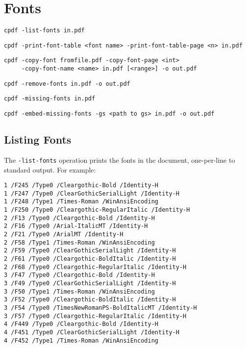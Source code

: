 \documentclass{book}
\begin{document}
\chapter{Fonts}\pagestyle{fancy}\label{chap:14}
 {\small \begin{framed}

  \small\noindent\verb!cpdf -list-fonts in.pdf!

  \vspace{1.5mm}
  \noindent\verb!cpdf -print-font-table <font name> -print-font-table-page <n> in.pdf!
  
  \vspace{1.5mm}
  \noindent\verb!cpdf -copy-font fromfile.pdf -copy-font-page <int>!\\
  \noindent\verb!     -copy-font-name <name> in.pdf [<range>] -o out.pdf!

  \vspace{1.5mm}
  \noindent\verb!cpdf -remove-fonts in.pdf -o out.pdf!

  \vspace{1.5mm}
  \noindent\verb!cpdf -missing-fonts in.pdf!

  \vspace{1.5mm}
  \noindent\verb!cpdf -embed-missing-fonts -gs <path to gs> in.pdf -o out.pdf!
  \end{framed}}

\section{Listing Fonts}

\label{listingfonts}
  The \texttt{-list-fonts} operation prints the fonts in the document,
one-per-line to standard output. For example:
\begin{framed}\small\begin{verbatim}1 /F245 /Type0 /Cleargothic-Bold /Identity-H
1 /F247 /Type0 /ClearGothicSerialLight /Identity-H
1 /F248 /Type1 /Times-Roman /WinAnsiEncoding
1 /F250 /Type0 /Cleargothic-RegularItalic /Identity-H
2 /F13 /Type0 /Cleargothic-Bold /Identity-H
2 /F16 /Type0 /Arial-ItalicMT /Identity-H
2 /F21 /Type0 /ArialMT /Identity-H
2 /F58 /Type1 /Times-Roman /WinAnsiEncoding
2 /F59 /Type0 /ClearGothicSerialLight /Identity-H
2 /F61 /Type0 /Cleargothic-BoldItalic /Identity-H
2 /F68 /Type0 /Cleargothic-RegularItalic /Identity-H
3 /F47 /Type0 /Cleargothic-Bold /Identity-H
3 /F49 /Type0 /ClearGothicSerialLight /Identity-H
3 /F50 /Type1 /Times-Roman /WinAnsiEncoding
3 /F52 /Type0 /Cleargothic-BoldItalic /Identity-H
3 /F54 /Type0 /TimesNewRomanPS-BoldItalicMT /Identity-H
3 /F57 /Type0 /Cleargothic-RegularItalic /Identity-H
4 /F449 /Type0 /Cleargothic-Bold /Identity-H
4 /F451 /Type0 /ClearGothicSerialLight /Identity-H
4 /F452 /Type1 /Times-Roman /WinAnsiEncoding
\end{verbatim}
\end{framed}
\end{document}
